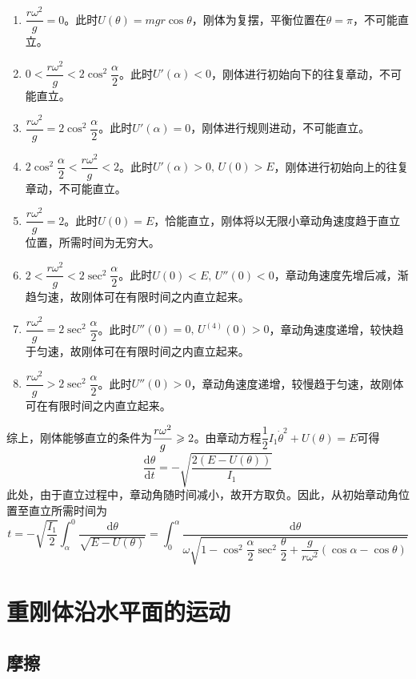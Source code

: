 \begin{solution}
\begin{enumerate}
	\item $\dfrac{r\omega^2}{g} = 0$。此时$U(\theta) = mgr\cos \theta$，刚体为复摆，平衡位置在$\theta = \pi$，不可能直立。
	\item $0 < \dfrac{r\omega^2}{g} < 2\cos^2 \dfrac{\alpha}{2}$。此时$U'(\alpha)<0$，刚体进行初始向下的往复章动，不可能直立。
	\item $\dfrac{r\omega^2}{g} = 2\cos^2 \dfrac{\alpha}{2}$。此时$U'(\alpha) = 0$，刚体进行规则进动，不可能直立。
	\item $2\cos^2 \dfrac{\alpha}{2} < \dfrac{r\omega^2}{g} < 2$。此时$U'(\alpha) > 0,\,U(0) > E$，刚体进行初始向上的往复章动，不可能直立。
	\item $\dfrac{r\omega^2}{g} = 2$。此时$U(0) = E$，恰能直立，刚体将以无限小章动角速度趋于直立位置，所需时间为无穷大。
	\item $2 < \dfrac{r\omega^2}{g} < 2\sec^2 \dfrac{\alpha}{2}$。此时$U(0)<E,\,U''(0)<0$，章动角速度先增后减，渐趋匀速，故刚体可在有限时间之内直立起来。
	\item $\dfrac{r\omega^2}{g} = 2\sec^2 \dfrac{\alpha}{2}$。此时$U''(0) = 0,\,U^{(4)}(0) > 0$，章动角速度递增，较快趋于匀速，故刚体可在有限时间之内直立起来。
	\item $\dfrac{r\omega^2}{g} > 2\sec^2 \dfrac{\alpha}{2}$。此时$U''(0) > 0$，章动角速度递增，较慢趋于匀速，故刚体可在有限时间之内直立起来。
\end{enumerate}
综上，刚体能够直立的条件为$\displaystyle\frac{r\omega^2}{g} \geqslant 2$。由章动方程$\dfrac12 I_1 \dot{\theta}^2 + U(\theta) = E$可得
\begin{equation*}
	\frac{\mathrm{d} \theta}{\mathrm{d} t} = -\sqrt{\frac{2(E-U(\theta))}{I_1}}
\end{equation*}
此处，由于直立过程中，章动角随时间减小，故开方取负。因此，从初始章动角位置至直立所需时间为
\begin{equation*}
	t = -\sqrt{\frac{I_1}{2}} \int_\alpha^0 \frac{\mathrm{d} \theta}{\sqrt{E-U(\theta)}} = \int_0^\alpha \frac{\mathrm{d} \theta}{\omega\sqrt{1 - \cos^2 \dfrac{\alpha}{2} \sec^2 \dfrac{\theta}{2} + \dfrac{g}{r\omega^2}(\cos \alpha-\cos \theta)}}
\end{equation*}
\end{solution}

\section{重刚体沿水平面的运动}

\subsection{摩擦}


